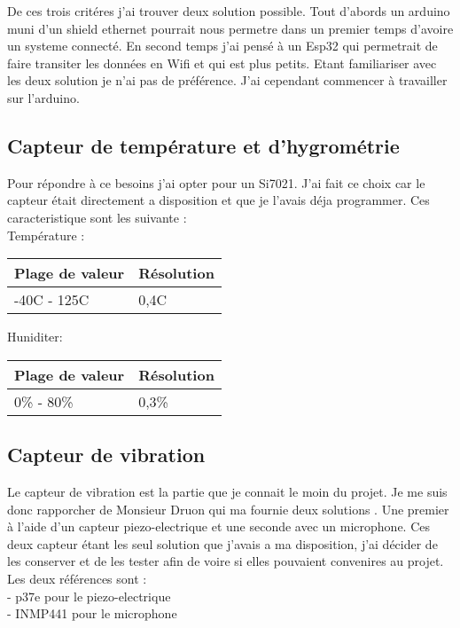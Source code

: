 \documentclass[5pt]{article}
\begin{document}
De ces trois critéres j'ai trouver deux solution possible. 
Tout d'abords un arduino muni d'un shield ethernet pourrait nous permetre dans un premier temps d'avoire un systeme connecté.
En second temps j'ai pensé à un Esp32 qui permetrait de faire transiter les données en Wifi et qui est plus petits. 
Etant familiariser avec les deux solution je n'ai pas de préférence. J'ai cependant commencer à travailler sur l'arduino.

\subsection{Capteur de température et d'hygrométrie }
Pour répondre à ce besoins j'ai opter pour un Si7021. J'ai fait ce choix car le capteur était directement a disposition et que je l'avais déja programmer. Ces caracteristique sont les suivante :\\
Température :\\
\begin{center}
    \begin{tabular}{|l|l|}
	\hline
	    Plage de valeur & Résolution \\
	\hline
	    -40C - 125C & 0,4C \\
	\hline
    \end{tabular}
\end{center}


Huniditer:\\
\begin{center}
    \begin{tabular}{|l|l|}
	\hline
	    Plage de valeur & Résolution \\
	\hline
	    0\% - 80\% & 0,3\% \\
	\hline
    \end{tabular}
\end{center}

\subsection{Capteur de vibration}
Le capteur de vibration est la partie que je connait le moin du projet. Je me suis donc rapporcher de Monsieur Druon qui ma fournie deux solutions . Une premier à l'aide d'un capteur piezo-electrique et une seconde avec un  microphone. Ces deux capteur étant les seul solution que j'avais a ma disposition, j'ai décider de les conserver et de les tester afin de voire si elles pouvaient convenires au projet.\\
Les deux références sont :\\
- p37e pour le piezo-electrique\\
- INMP441 pour le microphone\\
\end{document}

